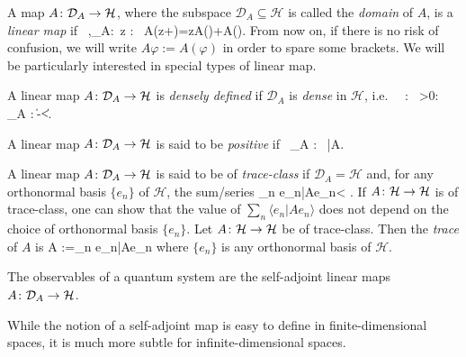 \bd
A map $A\colon\mathcal{D}_A\to \mathcal{H}$, where the subspace $\mathcal{D}_A\subseteq \mathcal{H}$ is called the \emph{domain} of $A$, is a \emph{linear map} if
\bse
\forall \, \varphi,\psi\in{}_A:\forall \, z \in \C : \ A(z\varphi+\psi)=zA(\varphi)+A(\psi).
\ese
\ed
From now on, if there is no risk of confusion, we will write $A\varphi:=A(\varphi)$ in order to spare some brackets. We will be particularly interested in special types of linear map.




\bd
A linear map $A\colon\mathcal{D}_A\to \mathcal{H}$ is \emph{densely defined} if $\mathcal{D}_A$ is \emph{dense} in $\mathcal{H}$, i.e.\
\bse
\forall \, \psi\in {} : \forall \, \varepsilon >0: \exists \, \alpha \in {}_A  :\ \|\alpha-\psi\|<\varepsilon.
\ese
\ed

\bd
A linear map $A\colon\mathcal{D}_A\to \mathcal{H}$ is said to be \emph{positive} if 
\bse
\forall \, \psi\in{}_A : \ \langle\psi|A\psi\rangle{}.
\ese
\ed


\bd
A linear map $A\colon\mathcal{D}_A\to \mathcal{H}$ is said to be of \emph{trace-class} if $\mathcal{D}_A=\mathcal{H}$ and, for any orthonormal basis $\{e_n\}$ of $\mathcal{H}$, the sum/series
\bse
\sum_n \langle e_n|Ae_n\rangle < \infty.
\ese
\ed
If $A\colon\mathcal{H}\to \mathcal{H}$ is of trace-class, one can show that the value of $\sum_n \langle e_n|Ae_n\rangle$ does not depend on the choice of orthonormal basis $\{e_n\}$. 
\bd
Let $A\colon\mathcal{H}\to \mathcal{H}$ be of trace-class. Then the \emph{trace} of $A$ is
\bse
\Tr A :=\sum_n \langle e_n|Ae_n\rangle 
\ese
where $\{e_n\}$ is any orthonormal basis of $\mathcal{H}$.
\ed
\begin{tcolorbox}[colframe=blue!10!black]
\begin{axiom}[Observables]
The observables of a quantum system are the self-adjoint linear maps $A\colon\mathcal{D}_A\to \mathcal{H}$.
\end{axiom}
\end{tcolorbox}
While the notion of a self-adjoint map is easy to define in finite-dimensional spaces, it is much more subtle for infinite-dimensional spaces.

